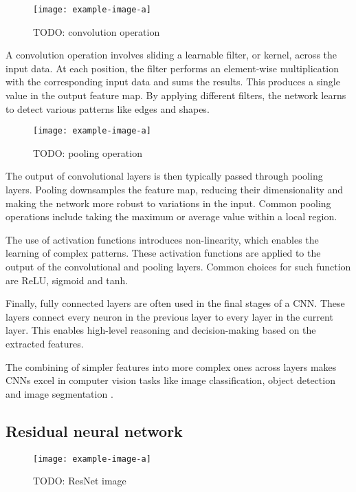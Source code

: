 \begin{figure}[hbtp]
    \centering    
    \texttt{[image: example-image-a]}
    \caption{TODO: convolution operation}
\end{figure}

A convolution operation involves sliding a learnable filter, or kernel, across the input data.
At each position, the filter performs an element-wise multiplication with the corresponding input data and sums the results.
This produces a single value in the output feature map.
By applying different filters, the network learns to detect various patterns like edges and shapes.

\begin{figure}[hbtp]
    \centering    
    \texttt{[image: example-image-a]}
    \caption{TODO: pooling operation}
\end{figure}

The output of convolutional layers is then typically passed through pooling layers.
Pooling downsamples the feature map, reducing their dimensionality and making the network more robust to variations in the input.
Common pooling operations include taking the maximum or average value within a local region. %

The use of activation functions introduces non-linearity, which enables the learning of complex patterns.
These activation functions are applied to the output of the convolutional and pooling layers.
Common choices for such function are ReLU, sigmoid and tanh.

Finally, fully connected layers are often used in the final stages of a CNN.
These layers connect every neuron in the previous layer to every layer in the current layer.
This enables high-level reasoning and decision-making based on the extracted features.

The combining of simpler features into more complex ones across layers makes CNNs excel in computer vision tasks like image classification, object detection and image segmentation \cite{}.

\subsection{Residual neural network}

\begin{figure}[hbtp]
\centering    
\texttt{[image: example-image-a]}
\caption{TODO: ResNet image}
\end{figure}

